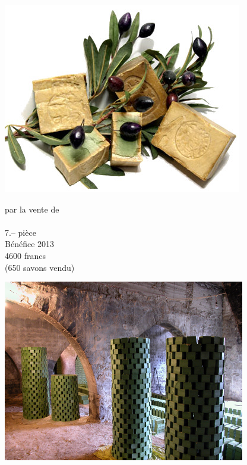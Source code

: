 \documentclass[frenchb,16pt,parskip=half-]{scrartcl}
\begin{document}
\begin{center}
\end{center}\vspace{-2em}
\begin{minipage}[c]{5cm}
    \includegraphics[width=\linewidth]{img/sav04.jpg}
\end{minipage}\hfill
\begin{minipage}[c]{8.5cm}\centering\huge
	par la vente de\\ \\ 7.-- pièce
	\\\small
   Bénéfice 2013\\
	4600 francs\\
	(650 savons vendu)
\end{minipage}\hfill
\begin{minipage}[c]{5cm}
    \includegraphics[width=\linewidth]{img/sav03.jpg}
\end{minipage}\vfill
\end{document}
